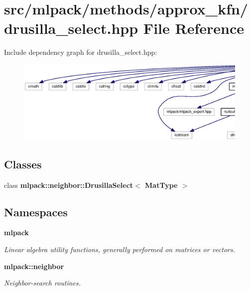 \section{src/mlpack/methods/approx\+\_\+kfn/drusilla\+\_\+select.hpp File Reference}
\label{drusilla__select_8hpp}
Include dependency graph for drusilla\+\_\+select.\+hpp\+:
\nopagebreak
\begin{figure}[H]
\begin{center}
\leavevmode
\includegraphics[width=350pt]{drusilla__select_8hpp__incl}
\end{center}
\end{figure}
\subsection*{Classes}
\begin{DoxyCompactItemize}
\item 
class {\bf mlpack\+::neighbor\+::\+Drusilla\+Select$<$ Mat\+Type $>$}
\end{DoxyCompactItemize}
\subsection*{Namespaces}
\begin{DoxyCompactItemize}
\item 
 {\bf mlpack}
\begin{DoxyCompactList}\small\item\em Linear algebra utility functions, generally performed on matrices or vectors. \end{DoxyCompactList}\item 
 {\bf mlpack\+::neighbor}
\begin{DoxyCompactList}\small\item\em Neighbor-\/search routines. \end{DoxyCompactList}\end{DoxyCompactItemize}


